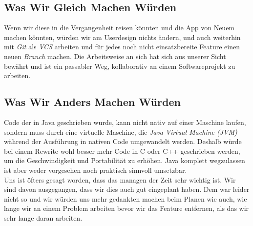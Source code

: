 \documentclass[a4paper,11pt]{article}
\begin{document}
\subsection{Was Wir Gleich Machen Würden}
Wenn wir diese in die Vergangenheit reisen könnten und die App von Neuem machen könnten, würden wir am Userdesign nichts ändern, und auch weiterhin mit \textit{Git} als \textit{VCS} arbeiten und für jedes noch nicht einsatzbereite Feature einen neuen \textit{Branch} machen. Die Arbeitsweise an sich hat sich aus unserer Sicht bewährt und ist ein passabler Weg, kollaborativ an einem Softwareprojekt zu arbeiten.
\subsection{Was Wir Anders Machen Würden}

Code der in Java geschrieben wurde, kann nicht nativ auf einer Maschine laufen, sondern muss durch eine virtuelle Maschine, die \textit{Java Virtual Machine (JVM)} während der Ausführung in nativen Code umgewandelt werden. Deshalb würde bei einem Rewrite wohl besser mehr Code in C oder C++ geschrieben werden, um die Geschwindigkeit und Portabilität zu erhöhen. Java komplett wegzulassen ist aber weder vorgesehen noch praktisch sinnvoll umsetzbar. \\

Uns ist öfters gesagt worden, dass das managen der Zeit sehr wichtig ist. Wir sind davon ausgegangen, dass wir dies auch gut eingeplant haben. Dem war leider nicht so und wir 
würden uns mehr gedankten machen beim Planen wie auch, wie lange wir an einem Problem arbeiten bevor wir das Feature entfernen, als das wir sehr lange daran arbeiten. 


\end{document}
